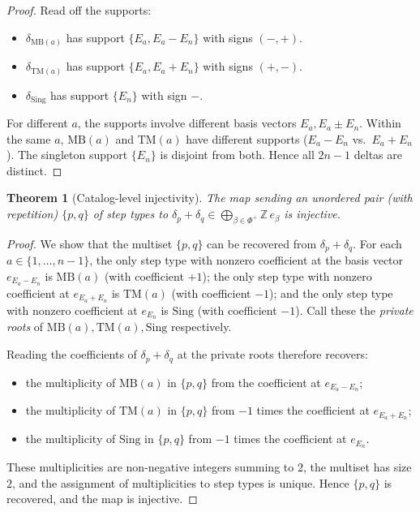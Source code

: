\documentclass[11pt]{article}
\newtheorem{theorem}{Theorem}[section]
\theoremstyle{definition}
\theoremstyle{remark}
\newcommand{\Sing}{\mathrm{Sing}}
\newcommand{\MB}{\mathrm{MB}}
\newcommand{\TM}{\mathrm{TM}}
\begin{document}
\begin{proof}
Read off the supports:
\begin{itemize}[leftmargin=2em]
  \item $\delta_{\MB(a)}$ has support $\{E_a, E_a - E_n\}$ with signs $(-, +)$.
  \item $\delta_{\TM(a)}$ has support $\{E_a, E_a + E_n\}$ with signs $(+, -)$.
  \item $\delta_{\Sing}$ has support $\{E_n\}$ with sign $-$.
\end{itemize}
For different $a$, the supports involve different basis vectors $E_a, E_a \pm E_n$.
Within the same $a$, $\MB(a)$ and $\TM(a)$ have different supports
($E_a - E_n$ vs.~$E_a + E_n$). The singleton support $\{E_n\}$ is disjoint from
both. Hence all $2n - 1$ deltas are distinct.
\end{proof}

\begin{theorem}[Catalog-level injectivity]\label{thm:appendix-catalog-injectivity}
The map sending an unordered pair (with repetition) $\{p, q\}$ of step types to
$\delta_p + \delta_q \in \bigoplus_{\beta \in \Phi^+} \mathbb{Z}\, e_\beta$ is
injective.
\end{theorem}

\begin{proof}
We show that the multiset $\{p, q\}$ can be recovered from $\delta_p + \delta_q$.
For each $a \in \{1, \ldots, n - 1\}$, the only step type with nonzero
coefficient at the basis vector $e_{E_a - E_n}$ is $\MB(a)$ (with coefficient
$+1$); the only step type with nonzero coefficient at $e_{E_a + E_n}$ is
$\TM(a)$ (with coefficient $-1$); and the only step type with nonzero
coefficient at $e_{E_n}$ is $\Sing$ (with coefficient $-1$). Call these the
\emph{private roots} of $\MB(a), \TM(a), \Sing$ respectively.

Reading the coefficients of $\delta_p + \delta_q$ at the private roots therefore
recovers:
\begin{itemize}[leftmargin=2em]
  \item the multiplicity of $\MB(a)$ in $\{p, q\}$ from the coefficient at
    $e_{E_a - E_n}$;
  \item the multiplicity of $\TM(a)$ in $\{p, q\}$ from $-1$ times the
    coefficient at $e_{E_a + E_n}$;
  \item the multiplicity of $\Sing$ in $\{p, q\}$ from $-1$ times the
    coefficient at $e_{E_n}$.
\end{itemize}
These multiplicities are non-negative integers summing to $2$, the multiset has
size $2$, and the assignment of multiplicities to step types is unique. Hence
$\{p, q\}$ is recovered, and the map is injective.
\end{proof}
\end{document}
